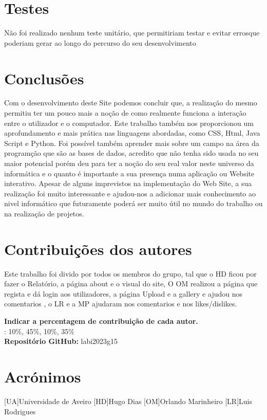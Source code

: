 \documentclass{report}
\begin{document}
\chapter{Testes}
\label{chap.testes}
Não foi realizado nenhum teste unitário, que permitiriam testar e evitar errosque poderiam gerar ao longo do percurso do seu desenvolvimento 

\chapter{Conclusões}
\label{chap.conclusao}
Com o desenvolvimento deste Site podemos concluir que, a realização do mesmo permitiu ter um pouco mais a noção de como realmente funciona a interação entre o utilizador e o computador. Este trabalho também nos proporcionou um aprofundamento e mais prática nas linguagens abordadas, como CSS, Html, Java Script e Python.
Foi possível também aprender mais sobre um campo na área da programção que são as bases de dados, acredito que não tenha sido usada no seu maior potencial porém deu para ter a noção do seu real valor neste universo da informática e o quanto é importante a sua presença numa aplicação ou Website interativo.
Apesar de alguns imprevistos na implementação do Web Site, a sua realização foi muito interessante e ajudou-nos a adicionar mais conhecimento ao nivel informático que futuramente poderá ser muito útil no mundo do trabalho ou na realização de projetos. 

\chapter*{Contribuições dos autores}
Este trabalho foi divido por todos os membros do grupo, tal que o \ac{HD} ficou por fazer o Relatório, a página about e o visual do site, O \ac{OM} realizou a página que regista e dá login aos utilizadores, a página Upload e a gallery e ajudou nos comentarios , o \ac{LR} e a \ac{MP} ajudaram nos comentarios e nos likes/dislikes.

\vspace{10pt}
\textbf{Indicar a percentagem de contribuição de cada autor.}\\

\autores : 10\%, 45\%, 10\%, 35\%\\

\textbf{Repositório GitHub:} labi2023g15

\chapter*{Acrónimos}
\begin{acronym}
[UA]{Universidade de Aveiro}
[HD]{Hugo Dias}
[OM]{Orlando Marinheiro}
[LR]{Luis Rodrigues}
\end{acronym}


\printbibliography
\end{document}
